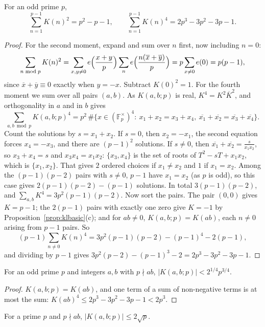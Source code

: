 \begin{lemma}[moments]\label{lem:klmoments}
For an odd prime $p$,
\[
\sum_{n=1}^{p-1}K(n)^2=p^2-p-1,\qquad\sum_{n=1}^{p-1}K(n)^4=2p^3-3p^2-3p-1.
\]
\end{lemma}
\begin{proof}
For the second moment, expand and sum over $n$ first, now including $n=0$:
\[
\sum_{n\bmod p}K(n)^2=\sum_{x,y\ne0}e\Bigl(\frac{x+y}p\Bigr)\sum_ne\Bigl(\frac{n(\overline x+\overline y)}p\Bigr)=p\sum_{x\ne0}e(0)=p(p-1),
\]
since $\overline x+\overline y\equiv0$ exactly when $y=-x$. Subtract $K(0)^2=1$.
For the fourth moment we sum over all pairs $(a,b)$. As $K(a,b;p)$ is real, $K^4=K^2\overline K^2$, and orthogonality in $a$ and in $b$ gives
\[
\sum_{a,b\bmod p}K(a,b;p)^4=p^2\,\#\bigl\{x\in(\mathbb F_p^\times)^4:\ x_1+x_2=x_3+x_4,\ \overline{x_1}+\overline{x_2}=\overline{x_3}+\overline{x_4}\bigr\}.
\]
Count the solutions by $s=x_1+x_2$. If $s=0$, then $x_2=-x_1$, the second equation forces $x_4=-x_3$, and there are $(p-1)^2$ solutions. If $s\ne0$, then $\overline{x_1}+\overline{x_2}=\frac s{x_1x_2}$, so $x_3+x_4=s$ and $x_3x_4=x_1x_2$: $\{x_3,x_4\}$ is the set of roots of $T^2-sT+x_1x_2$, which is $\{x_1,x_2\}$. That gives $2$ ordered choices if $x_1\ne x_2$ and $1$ if $x_1=x_2$. Among the $(p-1)(p-2)$ pairs with $s\ne0$, $p-1$ have $x_1=x_2$ (as $p$ is odd), so this case gives $2(p-1)(p-2)-(p-1)$ solutions. In total $3(p-1)(p-2)$, and $\sum_{a,b}K^4=3p^2(p-1)(p-2)$.
Now sort the pairs. The pair $(0,0)$ gives $K=p-1$; the $2(p-1)$ pairs with exactly one zero give $K=-1$ by Proposition~\ref{prop:klbasic}(c); and for $ab\ne0$, $K(a,b;p)=K(ab)$, each $n\ne0$ arising from $p-1$ pairs. So
\[
(p-1)\sum_{n\ne0}K(n)^4=3p^2(p-1)(p-2)-(p-1)^4-2(p-1),
\]
and dividing by $p-1$ gives $3p^2(p-2)-(p-1)^3-2=2p^3-3p^2-3p-1$.
\end{proof}

\begin{theorem}[Kloosterman, 1926]\label{thm:kloosterman}
For an odd prime $p$ and integers $a,b$ with $p\nmid ab$, $|K(a,b;p)|<2^{1/4}p^{3/4}$.
\end{theorem}
\begin{proof}
$K(a,b;p)=K(ab)$, and one term of a sum of non-negative terms is at most the sum: $K(ab)^4\le2p^3-3p^2-3p-1<2p^3$.
\end{proof}

\begin{theorem}\label{thm:weil}
For a prime $p$ and $p\nmid ab$, $|K(a,b;p)|\le2\sqrt p$.
\end{theorem}


